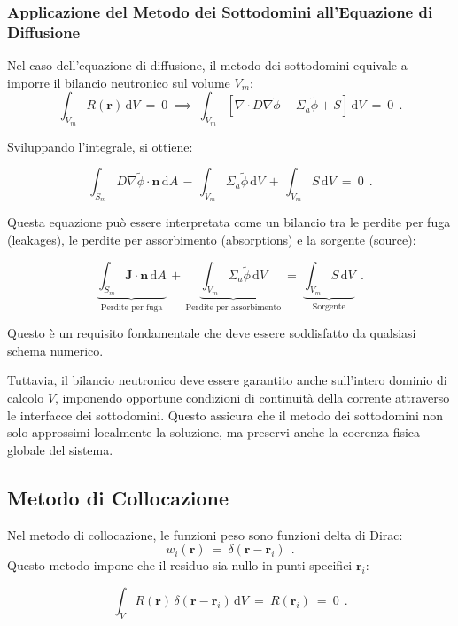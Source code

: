 	\subsubsection{Applicazione del Metodo dei Sottodomini all’Equazione di Diffusione}
	
	Nel caso dell’equazione di diffusione, il metodo dei sottodomini equivale a imporre il bilancio neutronico sul volume \(V_m\):
	\[
	\int_{V_m} R(\mathbf{r}) \, \mathrm{d}V \ =\ 0\ \implies\ \int_{V_m} \left[ \nabla \cdot D \nabla \tilde{\phi} - \Sigma_a \tilde{\phi} + S \right] \, \mathrm{d}V\ =\ 0\ \ .
	\]
	
	Sviluppando l’integrale, si ottiene:
	
	\[
	\int_{S_m} D \nabla \tilde{\phi} \cdot \mathbf{n} \, \mathrm{d}A\, -\, \int_{V_m} \Sigma_a \tilde{\phi} \, \mathrm{d}V \,+\, \int_{V_m} S \, \mathrm{d}V\ =\ 0\ \ .
	\]
	
	Questa equazione può essere interpretata come un bilancio tra le perdite per fuga (leakages), le perdite per assorbimento (absorptions) e la sorgente (source):
	
	\[
	\underbrace{\int_{S_m} \mathbf{J} \cdot \mathbf{n} \, \mathrm{d}A}_{\text{Perdite per fuga}} \,+\, \underbrace{\int_{V_m} \Sigma_a \tilde{\phi} \, \mathrm{d}V}_{\text{Perdite per assorbimento}}\ =\ \underbrace{\int_{V_m} S \, \mathrm{d}V}_{\text{Sorgente}}\ \ .
	\]
	
	Questo è un requisito fondamentale che deve essere soddisfatto da qualsiasi schema numerico.
	
	Tuttavia, il bilancio neutronico deve essere garantito anche sull'intero dominio di calcolo \(V\), imponendo opportune condizioni di continuità della corrente attraverso le interfacce dei sottodomini. Questo assicura che il metodo dei sottodomini non solo approssimi localmente la soluzione, ma preservi anche la coerenza fisica globale del sistema.
	
	
	
\subsection{Metodo di Collocazione}
	Nel metodo di collocazione, le funzioni peso sono funzioni delta di Dirac:
	\[
	w_i(\mathbf{r})\ =\ \delta(\mathbf{r} - \mathbf{r}_i)\ \ .
	\]
	Questo metodo impone che il residuo sia nullo in punti specifici \(\mathbf{r}_i\):
	
	\[\int_V R(\mathbf{r})\, \delta(\mathbf{r} - \mathbf{r}_i) \, \mathrm{d}V\ =\ R(\mathbf{r}_i)\ =\ 0\ \ .\]
	
